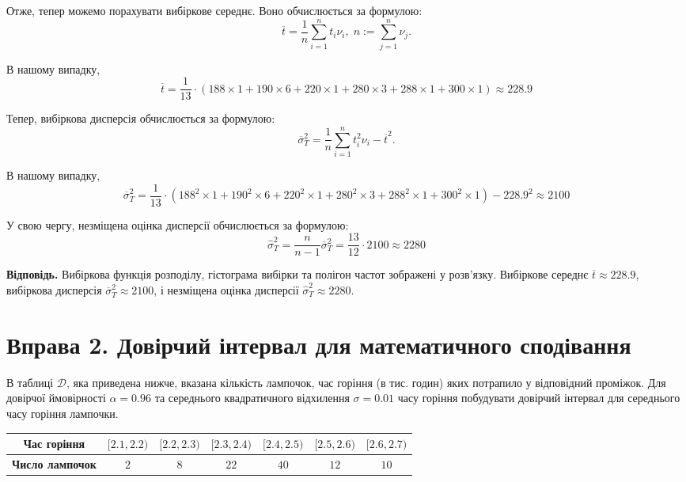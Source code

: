 \documentclass{../hw_template}
\begin{document}
Отже, тепер можемо порахувати вибіркове середнє. Воно обчислюється за формулою:
\begin{equation*}
    \overline{t} = \frac{1}{n}\sum_{i=1}^n t_i \nu_i, \; n := \sum_{j=1}^n \nu_j.
\end{equation*}

В нашому випадку, 
\begin{equation*}
    \overline{t} = \frac{1}{13} \cdot (188 \times 1 + 190 \times 6 + 220 \times 1 + 280 \times 3 + 288 \times 1 + 300 \times 1) \approx 228.9
\end{equation*}

Тепер, вибіркова дисперсія обчислюється за формулою:
\begin{equation*}
    \overline{\sigma}_T^2 = \frac{1}{n}\sum_{i=1}^n t_i^2\nu_i - \overline{t}^2.
\end{equation*}

В нашому випадку,
\begin{equation*}
    \overline{\sigma}_T^2 = \frac{1}{13} \cdot (188^2 \times 1 + 190^2 \times 6 + 220^2 \times 1 + 280^2 \times 3 + 288^2 \times 1 + 300^2 \times 1) - 228.9^2 \approx 2100
\end{equation*}

У свою чергу, незміщена оцінка дисперсії обчислюється за формулою:
\begin{equation*}
    \hat{\sigma}_T^2 = \frac{n}{n-1}\overline{\sigma}_T^2 = \frac{13}{12} \cdot 2100 \approx 2280
\end{equation*}

\textbf{Відповідь.} Вибіркова функція розподілу, гістограма вибірки та полігон
частот зображені у розв'язку. Вибіркове середнє $\overline{t} \approx 228.9$, вибіркова дисперсія $\overline{\sigma}_T^2 \approx 2100$, і незміщена оцінка дисперсії $\hat{\sigma}_T^2 \approx 2280$.

\pagebreak

\section{Вправа 2. Довірчий інтервал для математичного сподівання}

\begin{problem}
    В таблиці $\mathcal{D}$, яка приведена нижче, вказана кількість лампочок, час горіння
(в тис. годин) яких потрапило у відповідний проміжок. Для довірчої
ймовірності $\alpha=0.96$ та середнього квадратичного відхилення $\sigma = 0.01$ часу
горіння побудувати довірчий інтервал для середнього часу горіння лампочки.

\vspace{5px}
\begin{center}
    \begin{tabular}{|c|c|c|c|c|c|c|}
        \hline
        \textbf{Час горіння} & $[2.1,2.2)$ & $[2.2,2.3)$ & $[2.3,2.4)$ & $[2.4,2.5)$ & $[2.5,2.6)$ & $[2.6,2.7)$ \\
        \hline
        \textbf{Число лампочок} & $2$ & $8$ & $22$ & $40$ & $12$ & $10$ \\
        \hline
    \end{tabular}
\end{center}


\end{problem}
\end{document}
